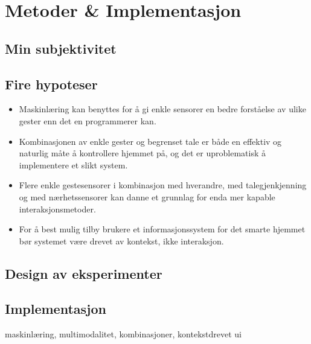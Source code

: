 \section[Metoder \& Implementasjon]{Metoder \& Implementasjon}
\subsection{Min subjektivitet}
\subsection{Fire hypoteser}
\begin{itemize}
\item Maskinlæring kan benyttes for å gi enkle sensorer en bedre forståelse av ulike gester enn det en programmerer kan.
\item Kombinasjonen av enkle gester og begrenset tale er både en effektiv og naturlig måte å kontrollere hjemmet på, og det er uproblematisk å implementere et slikt system.
\item Flere enkle gestesensorer i kombinasjon med hverandre, med talegjenkjenning og med nærhetssensorer kan danne et grunnlag for enda mer kapable interaksjonsmetoder.
\item For å best mulig tilby brukere et informasjonssystem for det smarte hjemmet bør systemet være drevet av kontekst, ikke interaksjon.
\end{itemize}

\subsection{Design av eksperimenter}
\subsection{Implementasjon}
maskinlæring, multimodalitet, kombinasjoner, kontekstdrevet ui
